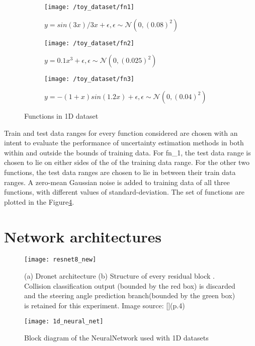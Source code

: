 \begin{figure}[H]
	\centering
	\begin{subfigure}[b]{0.3\textwidth}
		\centering
		\texttt{[image: /toy\_dataset/fn1]}
		\caption{$y=sin(3x)/3x+\epsilon, \epsilon \sim \mathcal{N}(0,(0.08)^2)$}
		\label{fig:y equals x}
	\end{subfigure}
	\hfill
	\begin{subfigure}[b]{0.3\textwidth}
		\centering
		\texttt{[image: /toy\_dataset/fn2]}
		\caption{$y=0.1x^3+\epsilon, \epsilon \sim \mathcal{N}(0,(0.025)^2)$}
		\label{fig:three sin x}
	\end{subfigure}
	\hfill
	\begin{subfigure}[b]{0.3\textwidth}
		\centering
		\texttt{[image: /toy\_dataset/fn3]}
		\caption{$y=-(1+x)sin(1.2x)+\epsilon, \epsilon \sim \mathcal{N}(0,(0.04)^2)$}
		\label{fig:five over x}
	\end{subfigure}
	\caption{Functions in 1D dataset}
	\label{fig_1d_dataset}
\end{figure}
Train and test data ranges for every function considered are chosen with an intent to evaluate the performance of uncertainty estimation methods in both within and outside the bounds of training data. For fn\_1, the test data range is chosen to lie on either sides of the of the training data range. For the other two functions, the test data ranges are chosen to lie in between their train data ranges. A zero-mean Gaussian noise is added to training data of all three functions, with different values of standard-deviation. The set of functions are plotted in the Figure\ref{fig_1d_dataset}. 
\section{Network architectures}
\begin{figure}[H]
	\texttt{[image: resnet8\_new]}
	\caption[Dronet architecture]{(a) Dronet architecture (b) Structure of every residual block . Collision classification output (bounded by the red box) is discarded and the steering angle prediction branch(bounded by the green box) is retained for this experiment.  Image source: [\cite{loquercio2018dronet}](p.4) }
	\label{fig_resnet8}
\end{figure}
\begin{figure}[H]
	\centering
	\texttt{[image: 1d\_neural\_net]}
	\caption{Block diagram of the NeuralNetwork used with 1D datasets}
	\label{fig_1dnet}
\end{figure}
